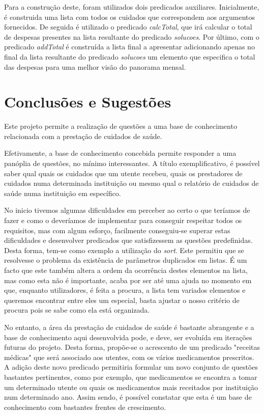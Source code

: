 \documentclass[a4paper]{article}
\begin{document}
Para a construção deste, foram utilizados dois predicados auxiliares. Inicialmente, é construida uma lista com todos os cuidados que correspondem aos argumentos fornecidos. De seguida é utilizado o predicado \emph{calcTotal}, que irá calcular o total de despesas presentes na lista resultante do predicado \emph{solucoes}. Por último, com o predicado \emph{addTotal} é construída a lista final a apresentar adicionando apenas no final da lista resultante do predicado \emph{solucoes} um elemento que especifica o total das despesas para uma melhor visão do panorama mensal.

\newpage
\section{Conclusões e Sugestões}

\hspace{3mm} Este projeto permite a realização de questões a uma base de conhecimento relacionada com a prestação de cuidados de saúde.

Efetivamente, a base de conhecimento concebida permite responder a uma panóplia de questões, no mínimo interessantes. A título exemplificativo, é possível saber qual quais os cuidados que um utente recebeu, quais os prestadores de cuidados numa determinada instituição ou mesmo qual o relatório de cuidados de saúde numa instituição em específico.

No inicio tivemos algumas dificuldades em perceber ao certo o que teríamos de fazer e como o deveríamos de implementar para conseguir respeitar todos os requisitos, mas com algum esforço, facilmente conseguiu-se superar estas dificuldades e desenvolver predicados que satisfizessem as questões predefinidas. Desta forma, tem-se como exemplo a utilização do \textit{sort}. Este permitiu que se resolvesse o problema da existência de parâmetros duplicados em listas. É um facto que este também altera a ordem da ocorrência destes elementos na lista, mas como esta não é importante, acaba por ser até uma ajuda no momento em que, enquanto utilizadores, é feita a procura, a lista tem variados elementos e queremos encontrar entre eles um especial, basta ajustar o nosso critério de procura pois se sabe como ela está organizada.

No entanto, a área da prestação de cuidados de saúde é bastante abrangente e a base de conhecimento aqui desenvolvida pode, e deve, ser evoluída em iterações futuras do projeto. Desta forma, propõe-se o acrescento de um predicado "receitas médicas" que será associado aos utentes, com os vários medicamentos prescritos. A adição deste novo predicado permitiria formular um novo conjunto de questões bastantes pertinentes, como por exemplo, que medicamentos se encontra a tomar um determinado utente ou quais os medicamentos mais receitados por instituição num determinado ano. Assim sendo, é possível constatar que esta é um base de conhecimento com bastantes frentes de crescimento.
\end{document}
